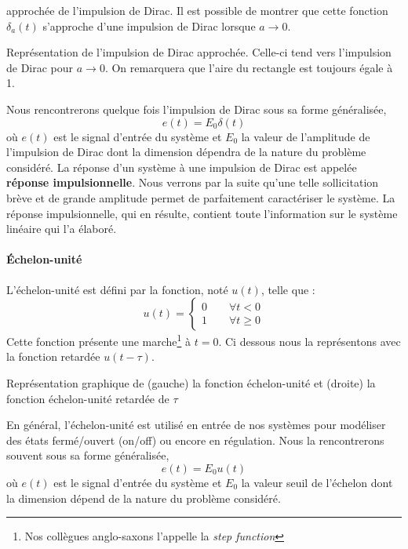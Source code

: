 approchée de l'impulsion de Dirac. Il est possible de montrer que cette fonction
$\delta_a(t)$ s'approche d'une impulsion de Dirac lorsque $a\to0$.
\begin{marginfigure}
    \centering
    
    \caption{Représentation de l'impulsion de Dirac approchée. 
             Celle-ci tend vers l'impulsion de Dirac pour $a\to0$. 
             On remarquera que l'aire du rectangle est toujours égale à 1.
             \label{fig-dirac2}}
\end{marginfigure}
Nous rencontrerons quelque fois l'impulsion de Dirac sous sa forme généralisée, 
\[
e(t)=E_0\delta(t)
\]
où $e(t)$ est le signal d'entrée du système et $E_0$ la valeur de l'amplitude 
de l'impulsion de Dirac dont la dimension dépendra de la nature du 
problème considéré.
La réponse d'un système à une impulsion de Dirac est appelée 
\textbf{réponse impulsionnelle}.
Nous verrons par la suite qu'une telle sollicitation brève et de grande 
amplitude permet de parfaitement caractériser le système. La réponse 
impulsionnelle, qui en résulte, contient toute l'information sur le système 
linéaire qui l'a élaboré.
\paragraph{\'Echelon-unité}
L'échelon-unité est défini par la fonction, noté $u(t)$, telle que :
\[
    u(t)=
    \begin{cases} 
    0 \qquad \forall t<0    \\ 
    1 \qquad \forall t\geq 0 
    \end{cases}
\]
Cette fonction présente une marche\footnote{Nos 
collègues anglo-saxons l'appelle la \og\emph{step function}\fg} à $t=0$. 
Ci dessous nous la représentons avec la fonction retardée $u(t-\tau)$.
\begin{marginfigure}
    \centering
    
    \caption{Représentation graphique de (gauche) la fonction échelon-unité 
             et (droite) la fonction échelon-unité retardée de $\tau$
            \label{fig-echelon}}
\end{marginfigure}
En général, l'échelon-unité est utilisé en entrée de nos systèmes pour 
modéliser des états fermé/ouvert (\og on/off\fg) ou encore en régulation.
Nous la rencontrerons souvent sous sa forme généralisée, 
\[
    e(t)=E_0u(t)
\]
où $e(t)$ est le signal d'entrée du système et $E_0$ la valeur seuil 
de l'échelon dont la dimension dépend de la nature du problème considéré.

